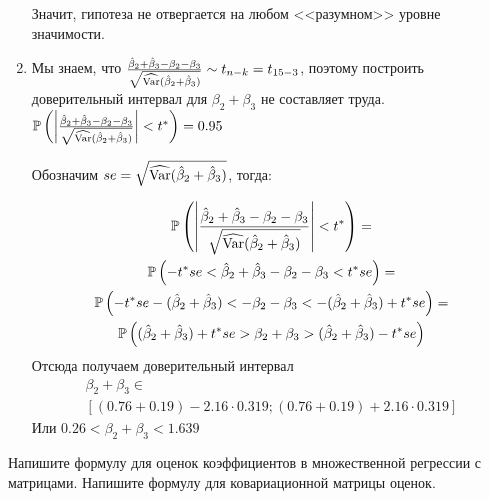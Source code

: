 \documentclass[pdftex,11pt,openany]{book}\usepackage[]{graphicx}\usepackage[]{color}
\begin{document}
\begin{solution}
\begin{enumerate}
Значит, гипотеза не отвергается на любом <<разумном>> уровне значимости.

\item Мы знаем, что $\frac{\hat{\beta}_2 + \hat{\beta}_3 - \beta_2 - \beta_3}{\sqrt{\widehat{\operatorname{Var}}(\hat{\beta}_2 + \hat{\beta}_3)}} \sim t_{n-k} = t_{15-3}$, поэтому построить доверительный интервал для $\beta_2 + \beta_3$ не составляет труда. $\mathbb{P}\left( \left| \frac{\hat{\beta}_2 + \hat{\beta}_3 - \beta_2 - \beta_3}{\sqrt{\widehat{\operatorname{Var}}(\hat{\beta}_2 + \hat{\beta}_3)}} \right| < t^* \right) = 0.95$

Обозначим $se=\sqrt{\widehat{\operatorname{Var}}(\hat{\beta}_2 + \hat{\beta}_3)}$, тогда:

\begin{multline}
\mathbb{P}\left( \left| \frac{\hat{\beta}_2 + \hat{\beta}_3 - \beta_2 - \beta_3}{\sqrt{\widehat{\operatorname{Var}}(\hat{\beta}_2 + \hat{\beta}_3)}} \right| < t^* \right) = \\
\mathbb{P}\left( -t^* se < \hat{\beta}_2 + \hat{\beta}_3 - \beta_2 - \beta_3 < t^* se \right) = \\ 
\mathbb{P}\left( -t^*se  - (\hat{\beta}_2 + \hat{\beta}_3) < - \beta_2 - \beta_3  < -(\hat{\beta}_2 + \hat{\beta}_3) + t^* se \right) =\\ 
\mathbb{P}\left( (\hat{\beta}_2 + \hat{\beta}_3) + t^* se 
> \beta_2 + \beta_3 
> (\hat{\beta}_2 + \hat{\beta}_3) - t^* se \right) 
\end{multline}
Отсюда получаем доверительный интервал
\begin{multline}
\beta_2 + \beta_3 \in \\
[(0.76 + 0.19) - 2.16 \cdot 0.319;  (0.76 + 0.19) + 2.16 \cdot 0.319 ]
\end{multline}
Или $0.26< \beta_2 + \beta_3  < 1.639  $
\end{enumerate}
\end{solution}


\begin{problem}
Напишите формулу для оценок коэффициентов в множественной регрессии с матрицами. Напишите формулу для ковариационной матрицы оценок.
\end{problem}

\begin{solution}
\end{solution}
\end{document}
